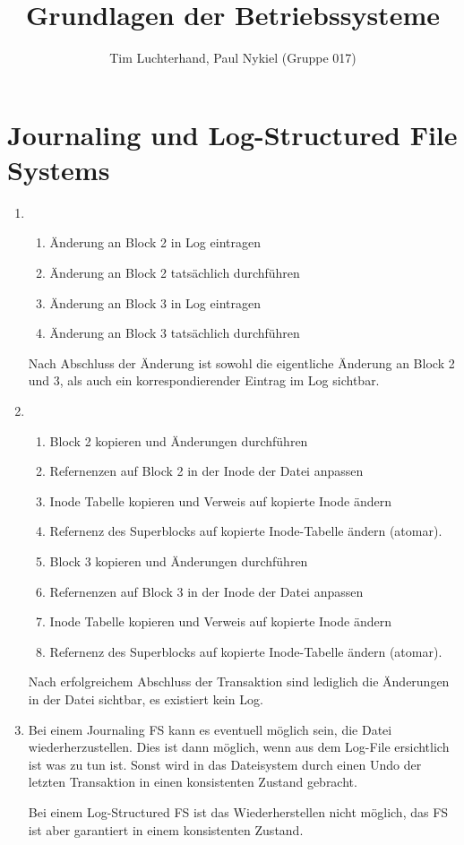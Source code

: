 \documentclass[DIN, pagenumber=false, fontsize=11pt, parskip=half]{scrartcl}
\title{Grundlagen der Betriebssysteme}
\author{Tim Luchterhand, Paul Nykiel (Gruppe 017)}
\begin{document}
    \maketitle
    \section{Journaling und Log-Structured File Systems}
    \begin{enumerate}[label=(\alph*)]
        \item 
            \begin{enumerate}
                \item Änderung an Block 2 in Log eintragen
                \item Änderung an Block 2 tatsächlich durchführen
                \item Änderung an Block 3 in Log eintragen
                \item Änderung an Block 3 tatsächlich durchführen
            \end{enumerate}
            Nach Abschluss der Änderung ist sowohl die eigentliche Änderung an Block 2 und 3, als auch ein korrespondierender Eintrag im Log sichtbar.
        \item 
            \begin{enumerate}
                \item Block 2 kopieren und Änderungen durchführen
                \item Refernenzen auf Block 2 in der Inode der Datei anpassen
                \item Inode Tabelle kopieren und Verweis auf kopierte Inode ändern
                \item Refernenz des Superblocks auf kopierte Inode-Tabelle ändern (atomar).
                \item Block 3 kopieren und Änderungen durchführen
                \item Refernenzen auf Block 3 in der Inode der Datei anpassen
                \item Inode Tabelle kopieren und Verweis auf kopierte Inode ändern
                \item Refernenz des Superblocks auf kopierte Inode-Tabelle ändern (atomar).
            \end{enumerate}
            Nach erfolgreichem Abschluss der Transaktion sind lediglich die Änderungen in der Datei sichtbar, es existiert kein Log.
        \item Bei einem Journaling FS kann es eventuell möglich sein, die Datei wiederherzustellen. Dies ist dann möglich, wenn aus dem Log-File ersichtlich ist was zu tun ist. Sonst wird in das Dateisystem durch einen Undo der letzten Transaktion in einen konsistenten Zustand gebracht. 
            
            Bei einem Log-Structured FS ist das Wiederherstellen nicht möglich, das FS ist aber garantiert in einem konsistenten Zustand.
    \end{enumerate}
\end{document}

